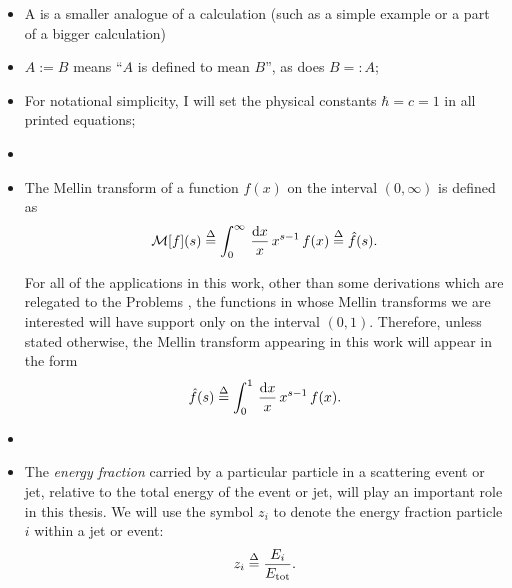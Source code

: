 \begin{itemize}
    \item
        A  is a smaller analogue of a calculation (such as a simple example or a part of a bigger calculation)

    \item
        \(A := B\) means ``\(A\) is defined to mean \(B\)'', as does \(B =: A\);

    \item
        For notational simplicity, I will set the physical constants \(\hbar = c = 1\) in all printed equations;

    \item

    \item
        The Mellin transform of a function \(f(x)\) on the interval $(0,\infty)$ is defined as
        \begin{align}
            \mathcal{M}[f](s)
            \overset{\Delta}{=}
            \int_0^\infty \,\frac{\dd x}{x}\, x^{s-1} \, f(x)
            \overset{\Delta}{=}
            \hat f(s)
            .
        \end{align}

        For all of the applications in this work, other than some derivations which are relegated to the Problems , the functions in whose Mellin transforms we are interested will have support only on the interval \((0,1)\).
        Therefore, unless stated otherwise, the Mellin transform appearing in this work will appear in the form
        \begin{align}
            \hat f(s)
            \overset{\Delta}{=}
            \int_0^1 \,\frac{\dd x}{x}\, x^{s-1} \, f(x)
            .
        \end{align}



    \item

    \item
        The \textit{energy fraction} carried by a particular particle in a scattering event or jet, relative to the total energy of the event or jet, will play an important role in this thesis.
        We will use the symbol \(z_i\) to denote the energy fraction particle \(i\) within a jet or event:
        \begin{align}
            z_i
            \overset{\Delta}{=}
            \frac{E_i}{E_\text{tot}}
            .
        \end{align}


\end{itemize}
